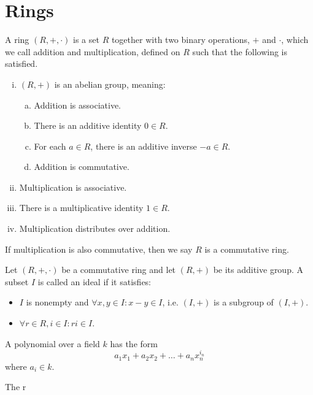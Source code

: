 \section{Rings}

\begin{defn}
  A ring $(R, +, \cdot)$ is a set $R$ together with two binary operations, $+$
  and $\cdot$, which we call addition and multiplication, defined on $R$ such
  that the following is satisfied.
  
  \begin{enumerate}[(i)]
    \item $(R,+)$ is an abelian group, meaning:
    \begin{enumerate}[(a)]
      \item Addition is associative.
      \item There is an additive identity $0 \in R$.
      \item For each $a \in R$, there is an additive inverse $-a \in R$.
      \item Addition is commutative.
    \end{enumerate}
    
    \item Multiplication is associative. 
    \item There is a multiplicative identity $1 \in R$.
    \item Multiplication distributes over addition.
  \end{enumerate}
  
  If multiplication is also commutative, then we say $R$ is a commutative ring.
\end{defn}

\begin{defn}
  Let $(R,+,\cdot)$ be a commutative ring and let $(R, +)$ be its additive
  group. A subset $I$ is called an ideal if it satisfies:
  \begin{itemize}
    \item $I$ is nonempty and $\forall x,y \in I : x-y \in I$, i.e. $(I,+)$ is a
    subgroup of $(I,+)$.
    \item $\forall r \in R, i \in I : ri \in I$.
  \end{itemize}
\end{defn}


\begin{defn}
  A polynomial over a field $k$ has the form
  \[ a_1 x_1 + a_2 x_2 + \ldots + a_n x_n^{i_n}\]
  where $a_i \in k$.
\end{defn}

\begin{defn}
  The r
\end{defn}